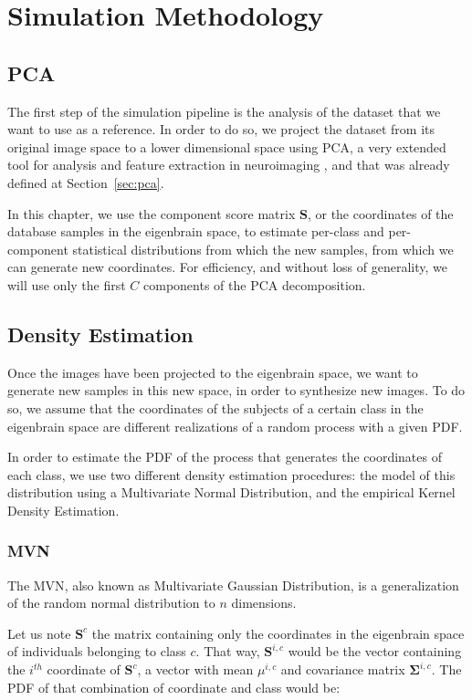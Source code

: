 \section{Simulation Methodology}
\subsection{\acf{PCA}}
The first step of the simulation pipeline is the analysis of the dataset that we want to use as a reference. In order to do so, we project the dataset from its original image space to a lower dimensional space using \ac{PCA}, a very extended tool for analysis and feature extraction in neuroimaging \cite{Illan2011,Khedher2015}, and that was already defined at Section~\ref{sec:pca}.

In this chapter, we use the component score matrix $\mathbf{S}$, or the coordinates of the database samples in the eigenbrain space, to estimate per-class and per-component statistical distributions from which the new samples, from which we can generate new coordinates. For efficiency, and without loss of generality, we will use only the first $C$ components of the \ac{PCA} decomposition. 

\subsection{Density Estimation}
Once the images have been projected to the eigenbrain space, we want to generate new samples in this new space, in order to synthesize new images. To do so, we assume that the coordinates of the subjects of a certain class in the eigenbrain space are different realizations of a random process with a given \ac{PDF}. 

In order to estimate the \ac{PDF} of the process that generates the coordinates of each class, we use two different density estimation procedures: the model of this distribution using a Multivariate Normal Distribution, and the empirical Kernel Density Estimation. 

\subsubsection{\acf{MVN}}
The \acf{MVN}, also known as Multivariate Gaussian Distribution, is a generalization of the random normal distribution to $n$ dimensions. 

Let us note $\mathbf{S}^{c}$ the matrix containing only the coordinates in the eigenbrain space of individuals belonging to class $c$. That way, $\mathbf{S}^{i,c}$ would be the vector containing the $i^{th}$ coordinate of $\mathbf{S}^{c}$, a vector with mean $\mu^{i,c}$ and covariance matrix $\boldsymbol{\Sigma}^{i,c}$. The \ac{PDF} of that combination of coordinate and class would be: 

